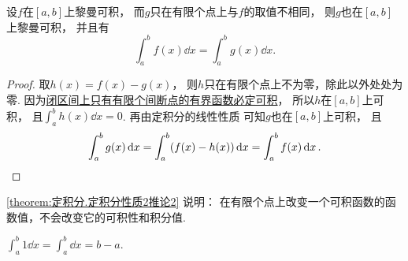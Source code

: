 \begin{corollary}\label{theorem:定积分.定积分性质2推论2}
设\(f\)在\([a,b]\)上黎曼可积，
而\(g\)只在有限个点上与\(f\)的取值不相同，
则\(g\)也在\([a,b]\)上黎曼可积，
并且有\begin{equation*}
	\int_a^b f(x) \dd{x}
	= \int_a^b g(x) \dd{x}.
\end{equation*}
\begin{proof}
取\(h(x) = f(x) - g(x)\)，
则\(h\)只在有限个点上不为零，除此以外处处为零.
因为\hyperref[theorem:定积分.黎曼可积条件.闭区间上只有有限个间断点的有界函数必定可积]{闭区间上只有有限个间断点的有界函数必定可积}，
所以\(h\)在\([a,b]\)上可积，
且\(\int_a^b h(x) \dd{x} = 0\).
再由定积分的线性性质 
可知\(g\)也在\([a,b]\)上可积，
且\begin{equation*}
	\int_a^b g(x) \dd{x}
	= \int_a^b (f(x) - h(x)) \dd{x}
	= \int_a^b f(x) \dd{x}.
	\qedhere
\end{equation*}
\end{proof}
\end{corollary}
\begin{remark}
\cref{theorem:定积分.定积分性质2推论2} 说明：
在有限个点上改变一个可积函数的函数值，不会改变它的可积性和积分值.
\end{remark}

\begin{property}\label{theorem:定积分.定积分性质4}
\(\int_a^b 1 \dd{x}
= \int_a^b \dd{x}
= b-a\).
\end{property}

